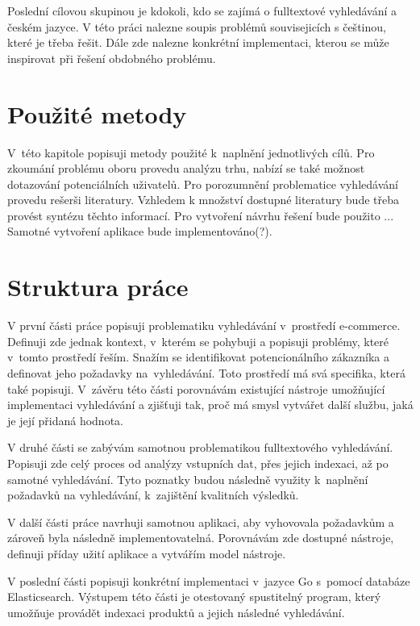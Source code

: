\documentclass[FM,DP]{tulthesis}
\begin{document}
Poslední cílovou skupinou je kdokoli, kdo se zajímá o fulltextové vyhledávání a českém jazyce.
V této práci nalezne soupis problémů souvisejicích s češtinou, které je třeba řešit. 
Dále zde nalezne konkrétní implementaci, kterou se může inspirovat při řešení obdobného problému.

\section{Použité metody}

V~této kapitole popisuji metody použité k~naplnění jednotlivých cílů. Pro zkoumání problému
oboru provedu analýzu trhu, nabízí se také možnost dotazování potenciálních uživatelů.
Pro porozumnění problematice vyhledávání provedu rešerši literatury. Vzhledem k množství
dostupné literatury bude třeba provést syntézu těchto informací. Pro vytvoření 
návrhu řešení bude použito ... Samotné vytvoření aplikace bude implementováno(?).

\section{Struktura práce}

V první části práce popisuji problematiku vyhledávání v~prostředí e-commerce. Definuji zde 
jednak kontext, v~kterém se pohybuji a popisuji problémy, které v~tomto prostředí řeším.
Snažím se identifikovat potencionálního zákazníka a definovat jeho požadavky na~vyhledávání.
Toto prostředí má svá specifika, která také popisuji. V~závěru této části porovnávám
existující nástroje umožňující implementaci vyhledávání a zjišťuji tak, proč má smysl
vytvářet další službu, jaká je její přidaná hodnota.

V druhé části se zabývám samotnou problematikou fulltextového vyhledávání. Popisuji zde celý
proces od analýzy vstupních dat, přes jejich indexaci, až po samotné vyhledávání. 
Tyto poznatky budou následně využity k~naplnění požadavků na vyhledávání, k~zajištění
kvalitních výsledků.

V další části práce navrhuji samotnou aplikaci, aby vyhovovala požadavkům a zároveň byla 
následně implementovatelná. Porovnávám zde dostupné nástroje, definuji příday užití aplikace
a vytvářím model nástroje.

V poslední části popisuji konkrétní implementaci v~jazyce Go s~pomocí databáze Elasticsearch.
Výstupem této části je otestovaný spustitelný program, který umožňuje provádět indexaci produktů
a jejich následné vyhledávání.
\end{document}
